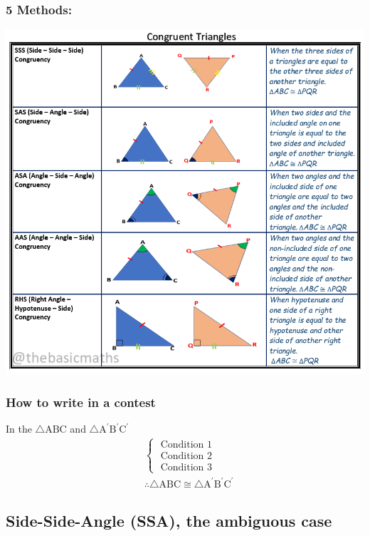 \documentclass{article}
\begin{document}
\subsubsection{5 Methods:}
\includegraphics[scale=.5]{congruent-triangles.png}
\subsubsection{How to write in a contest}
In the $\triangle \mathrm{ABC}$ and $\triangle \mathrm{A}^{\prime} \mathrm{B}^{\prime} \mathrm{C}^{\prime}$
$$
\begin{aligned}
& \left\{\begin{array}{l}
\text { Condition } 1 \\
\text { Condition } 2 \\
\text { Condition } 3
\end{array}\right. \\
& \therefore \triangle \mathrm{ABC} \cong \triangle \mathrm{A}^{\prime} \mathrm{B}^{\prime} \mathrm{C}^{\prime}
\end{aligned}
$$
\subsection{Side-Side-Angle (SSA), the ambiguous case}


\end{document}
